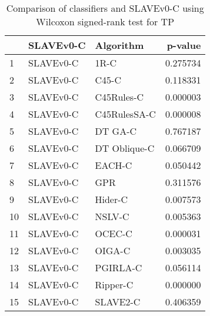 \begin{table}
\footnotesize
\caption{Comparison of classifiers and SLAVEv0-C using Wilcoxon signed-rank test for TP}
\label{tab:SLAVEv0-C wilcoxon TP comparison}
\begin{tabular}{lllr}
\hline
 & SLAVEv0-C & Algorithm & p-value \\
\hline
1 & SLAVEv0-C & 1R-C & 0.275734 \\
2 & SLAVEv0-C & C45-C & 0.118331 \\
3 & SLAVEv0-C & C45Rules-C & 0.000003 \\
4 & SLAVEv0-C & C45RulesSA-C & 0.000008 \\
5 & SLAVEv0-C & DT GA-C & 0.767187 \\
6 & SLAVEv0-C & DT Oblique-C & 0.066709 \\
7 & SLAVEv0-C & EACH-C & 0.050442 \\
8 & SLAVEv0-C & GPR & 0.311576 \\
9 & SLAVEv0-C & Hider-C & 0.007573 \\
10 & SLAVEv0-C & NSLV-C & 0.005363 \\
11 & SLAVEv0-C & OCEC-C & 0.000031 \\
12 & SLAVEv0-C & OIGA-C & 0.003035 \\
13 & SLAVEv0-C & PGIRLA-C & 0.056114 \\
14 & SLAVEv0-C & Ripper-C & 0.000000 \\
15 & SLAVEv0-C & SLAVE2-C & 0.406359 \\
\hline
\end{tabular}
\end{table}
